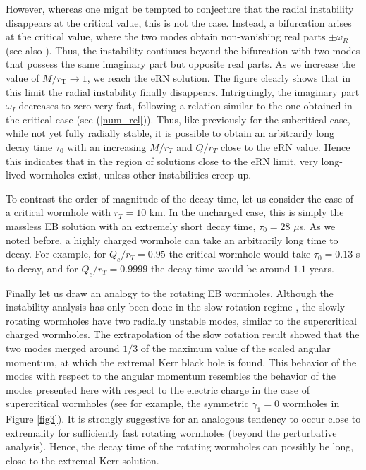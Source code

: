 \documentclass[floats,floatfix,showpacs,amssymb,prd,superscriptaddress,nofootinbib,nolongbibliography,reprint]{revtex4-2}
\begin{document}
%

However, whereas one might be tempted to conjecture that the radial instability disappears at the critical value, this is not the case.
Instead, a bifurcation arises at the critical value, where the two modes obtain non-vanishing real parts $\pm \omega_R$ (see also \cite{Gonzalez:2009hn}).
Thus, the instability continues beyond the bifurcation with two modes that possess the same imaginary part but opposite real parts.
As we increase the value of $M/r_\text{T} \to 1$, we reach 
the eRN solution.
The figure clearly shows that in this limit the radial instability finally disappears.
Intriguingly, the imaginary part $\omega_I$ decreases to zero very fast, following a relation similar to the one obtained in the critical case (see (\ref{num_rel})).
Thus, 
like previously for the subcritical case,
while not yet fully radially stable, it is 
possible to obtain an arbitrarily long decay time $\tau_0$ 
with an increasing
$M/r_T$ and $Q/r_T$ close to the eRN value. Hence this indicates that in the region of solutions close to the eRN limit, very long-lived wormholes exist, unless other instabilities creep up.



To contrast
the order of magnitude of the decay time, let us consider the case of a critical wormhole with $r_T=10$ km. In the uncharged case, this is simply the massless EB solution with an extremely short decay time, $\tau_0 = 28$  $\mu$s. 
As we noted before, a highly 
charged wormhole can take an arbitrarily long time to decay.
For example, for $Q_e/r_T=0.95$ the critical wormhole would 
take
$\tau_0=0.13$ s
to decay, 
and for $Q_e/r_T=0.9999$ the decay time would be around $1.1$ years.

%



Finally let us draw an analogy to the rotating EB wormholes.
Although the instability analysis has only been done in the slow rotation regime \cite{Azad:2023iju,Azad:2024axu}, the slowly rotating wormholes have two radially unstable modes, similar to the supercritical charged wormholes. The extrapolation of the slow rotation result showed that the two modes 
merged
around $1/3$ of the maximum value of the scaled angular momentum, 
at
which the extremal Kerr black hole is found. 
This behavior of the modes 
with respect to
the angular momentum 
resembles
the behavior of the modes presented here with respect to the electric charge in the case of supercritical wormholes (see for example, the symmetric $\gamma_1=0$ wormholes in Figure \ref{fig3}). 
It is strongly suggestive for an analogous tendency to occur
close to extremality
for sufficiently fast rotating wormholes (beyond the perturbative analysis).
Hence, the decay time of the rotating wormholes can possibly be long, close to the extremal Kerr solution.
\end{document}
